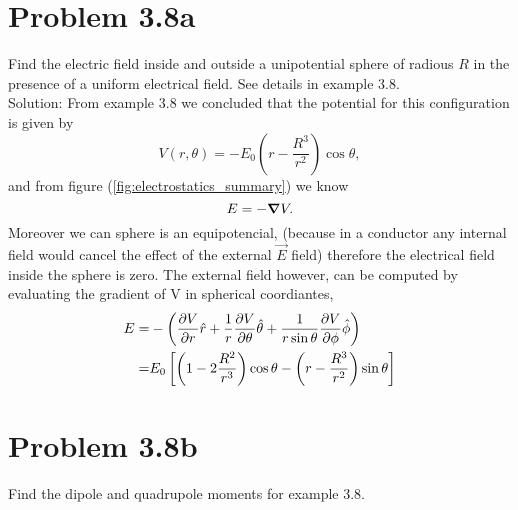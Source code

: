 \section{Problem 3.8a}
Find the electric field inside and outside a unipotential sphere of radious $R$ in the presence of a uniform electrical field. See details in example 3.8. \\

Solution: From example 3.8 we concluded that the potential for this configuration is given by
\begin{equation}
	V(r,\theta) = -E_0\left( r-\frac{R^3}{r^2} \right) \cos\theta,
\end{equation}
and from figure (\ref{fig:electrostatics_summary}) we know
\begin{equation}
	E = -\mbox{\boldmath$ \nabla $} V.
\end{equation}
Moreover we can sphere is an equipotencial, (because in a conductor any internal field would cancel the effect of the external $\vec{E}$ field) therefore the electrical field inside the sphere is zero.
The external field however, can be computed by evaluating the gradient of V in spherical coordiantes,
\begin{align*}
E = &-\left( \frac{\partial V}{\partial r}\hat{r}+\frac{1}{r}\frac{\partial V}{\partial \theta}\hat{\theta}+\frac{1}{r\sin\theta}\frac{\partial V}{\partial \phi}\hat{\phi} \right)\\
 = &E_0\left[ \left( 1-2\frac{R^2}{r^3} \right)\cos\theta 
 -\left(r-\frac{R^3}{r^2} \right)\sin\theta \right]
\end{align*}


\section{Problem 3.8b}
Find the dipole and quadrupole moments for example 3.8.\\

